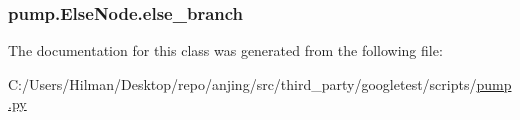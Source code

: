 \subsubsection[{else\+\_\+branch}]{\setlength{\rightskip}{0pt plus 5cm}pump.\+Else\+Node.\+else\+\_\+branch}\label{classpump_1_1_else_node_ac838a0fe9f5d713c7f56939eed5e128d}


The documentation for this class was generated from the following file\+:\begin{DoxyCompactItemize}
\item 
C\+:/\+Users/\+Hilman/\+Desktop/repo/anjing/src/third\+\_\+party/googletest/scripts/\hyperlink{pump_8py}{pump.\+py}\end{DoxyCompactItemize}
